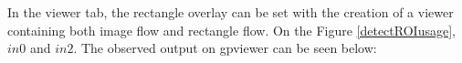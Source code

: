 \documentclass[12pt,a4paper]{article}
\begin{document}
In the viewer tab, the rectangle overlay can be set with the creation of a viewer containing both image flow and rectangle flow. On the Figure \ref{detectROIusage}, $in0$ and $in2$. The observed output on gpviewer can be seen below: \\
\newpage
\begin{figure}[!h]
\centering
{}
\end{figure}
\end{document}

